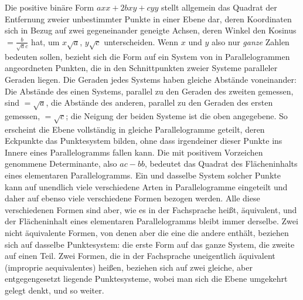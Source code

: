 Die positive binäre Form $axx+2bxy+cyy$ stellt allgemein das Quadrat der Entfernung zweier unbestimmter Punkte in einer Ebene dar, deren Koordinaten sich in Bezug auf zwei gegeneinander geneigte Achsen, deren Winkel den Kosinus $=\frac{b}{\surd ac}$ hat, um $x\surd a$, $y\surd c$ unterscheiden. Wenn $x$ und $y$ also nur \emph{ganze} Zahlen bedeuten sollen, bezieht sich die Form auf ein System von in Parallelogrammen angeordneten Punkten, die in den Schnittpunkten zweier Systeme paralleler Geraden liegen. Die Geraden jedes Systems haben gleiche Abstände voneinander: Die Abstände des einen Systems, parallel zu den Geraden des zweiten gemessen, sind $=\surd a$, die Abstände des anderen, parallel zu den Geraden des ersten gemessen, $=\surd c$; die Neigung der beiden Systeme ist die oben angegebene. So erscheint die Ebene vollständig in gleiche Parallelogramme geteilt, deren Eckpunkte das Punktesystem bilden, ohne dass irgendeiner dieser Punkte ins Innere eines Parallelogramms fallen kann. Die mit positivem Vorzeichen genommene Determinante, also $ac-bb$, bedeutet das Quadrat des Flächeninhalts eines elementaren Parallelogramms. Ein und dasselbe System solcher Punkte kann auf unendlich viele verschiedene Arten in Parallelogramme eingeteilt und daher auf ebenso viele verschiedene Formen bezogen werden. Alle diese verschiedenen Formen sind aber, wie es in der Fachsprache heißt, äquivalent, und der Flächeninhalt eines elementaren Parallelogramms bleibt immer derselbe. Zwei nicht äquivalente Formen, von denen aber die eine die andere enthält, beziehen sich auf dasselbe Punktesystem: die erste Form auf das ganze System, die zweite auf einen Teil. Zwei Formen, die in der Fachsprache uneigentlich äquivalent (improprie aequivalentes) heißen, beziehen sich auf zwei gleiche, aber entgegengesetzt liegende Punktesysteme, wobei man sich die Ebene umgekehrt gelegt denkt, und so weiter.

